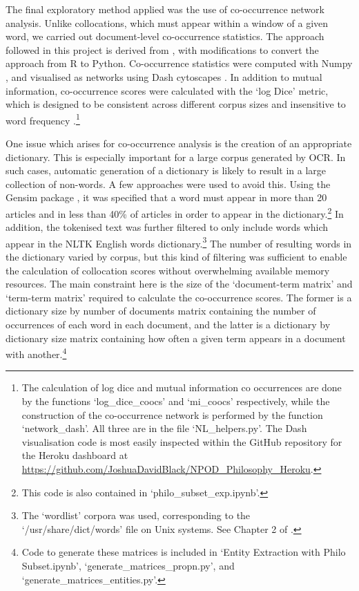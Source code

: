 \documentclass{article}
\begin{document}
The final exploratory method applied was the use of co-occurrence network analysis. Unlike collocations, which must appear within a window of a given word, we carried out document-level co-occurrence statistics. The approach followed in this project is derived from \cite{cooccurrence-tutorial}, with modifications to convert the approach from R to Python. Co-occurrence statistics were computed with Numpy \cite{harris2020array}, and visualised as networks using Dash cytoscapes \cite{plotly}. In addition to mutual information, co-occurrence scores were calculated with the `log Dice' metric, which is designed to be consistent across different corpus sizes and insensitive to word frequency \cite{logdice}.\footnote{The calculation of log dice and mutual information co occurrences are done by the functions `log\_\-dice\_\-coocs' and `mi\_\-coocs' respectively, while the construction of the co-occurrence network is performed by the function `network\_\-dash'. All three are in the file `NL\_\-helpers.py'. The Dash visualisation code is most easily inspected within the GitHub repository for the Heroku dashboard at \url{https://github.com/JoshuaDavidBlack/NPOD_Philosophy_Heroku}.}

One issue which arises for co-occurrence analysis is the creation of an appropriate dictionary. This is especially important for a large corpus generated by OCR. In such cases, automatic generation of a dictionary is likely to result in a large collection of non-words. A few approaches were used to avoid this. Using the Gensim package \cite{gensim}, it was specified that a word must appear in more than 20 articles and in less than 40\% of articles in order to appear in the dictionary.\footnote{This code is also contained in `philo\_\-subset\_\-exp.ipynb'.} In addition, the tokenised text was further filtered to only include words which appear in the NLTK English words dictionary.\footnote{The `wordlist' corpora was used, corresponding to the `/usr/share/dict/words' file on Unix systems. See Chapter 2 of \cite{bird-2009}.}
The number of resulting words in the dictionary varied by corpus, but this kind of filtering was sufficient to enable the calculation of collocation scores without overwhelming available memory resources. The main constraint here is the size of the `document-term matrix' and `term-term matrix' required to calculate the co-occurrence scores. The former is a dictionary size by number of documents matrix containing the number of occurrences of each word in each document, and the latter is a dictionary by dictionary size matrix containing how often a given term appears in a document with another.\footnote{Code to generate these matrices is included in `Entity Extraction with Philo Subset.ipynb', `generate\_\-matrices\_\-propn.py', and `generate\_\-matrices\_\-entities.py'.}
\end{document}
